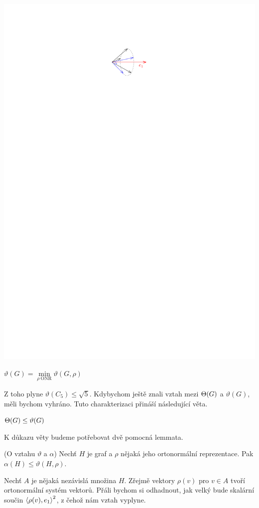 \begin{center}
\includegraphics{lovaszovo_paraplicko.pdf}
\end{center}

\df $\vartheta(G) = \min\limits_{\rho\ \text{ONR}} \vartheta(G,\rho)$

Z toho plyne $\vartheta(C_5)\le \sqrt 5$. Kdybychom ještě znali vztah mezi
$\Theta(G)$ a $\vartheta(G)$, měli bychom vyhráno. Tuto charakterizaci přináší
následující věta.

\vt $\Theta(G) \le \vartheta(G)$

\dk K důkazu věty budeme potřebovat dvě pomocná lemmata.


\lm (O vztahu $\vartheta$ a $\alpha$) Nechť $H$ je graf a $\rho$ nějaká jeho ortonormální reprezentace. Pak $\alpha(H) \leq \vartheta(H, \rho)$.

\dk Nechť $A$ je nějaká nezávislá množina $H$. Zřejmě vektory $\rho(v)$ pro $v \in A$ tvoří ortonormální systém vektorů. Přáli bychom si odhadnout, jak velký bude skalární součin ${\langle \rho(v),e_1\rangle}^2$, z čehož nám vztah vyplyne.

